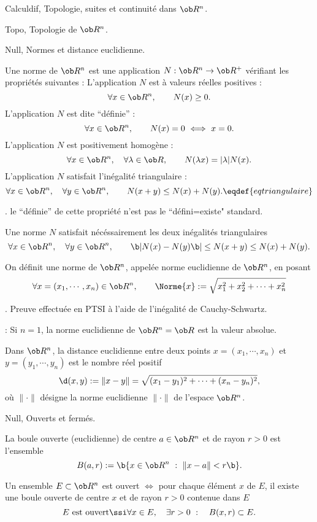 \Chapter Calculdif, Topologie, suites et continuit\'e dans $\ob R^n$.

\Section Topo, Topologie de $\ob R^n$. 

\Subsection Null, Normes et distance euclidienne. 

\Definition [$n\ge1$]
Une norme de $\ob R^n$ est une application $N:\ob R^n\to\ob R^+$ v\'erifiant les propri\'et\'es suivantes : 
\Bullet L'application $N$ est \`a valeurs r\'eelles positives :
$$
\forall x\in\ob R^n, \qquad N(x)\ge0.
$$
\Bullet L'application $N$ est dite ``d\'efinie'' :
$$
\forall x\in\ob R^n, \qquad N(x)=0\ \Longleftrightarrow\ x=0.
$$
\Bullet L'application $N$ est positivement homog\`ene :
$$
\forall x\in\ob R^n, \quad \forall \lambda\in\ob R,\qquad N(\lambda x)=|\lambda|N(x).
$$
\Bullet L'application $N$ satisfait l'in\'egalit\'e triangulaire :
$$
\forall x\in\ob R^n, \quad\forall y\in\ob R^n, \qquad N(x+y)\le N(x)+N(y).\eqdef{eqtriangulaire}
$$

. le ``d\'efinie'' de cette propri\'et\'e n'est pas le ``d\'efini=existe" standard. 
\medskip 

\noindent
{} Une norme $N$ satisfait n\'ec\'essairement les deux in\'egalit\'es triangulaires 
$$
\forall x\in\ob R^n, \quad \forall y\in\ob R^n, \qquad\b|N(x)-N(y)\b|\le N(x+y)\le N(x)+N(y).
$$

\Propriete [$n\ge1$] On d\'efinit une norme de $\ob R^n$, appel\'ee norme euclidienne de $\ob R^n$, en posant 
$$
\forall x=(x_1,\cdots, x_n)\in\ob R^n, \qquad \Norme{x}:=\sqrt{x_1^2+x_2^2+\cdots+x_n^2}
$$

\Demonstration. Preuve effectu\'ee en PTSI \`a l'aide de l'in\'egalit\'e de Cauchy-Schwartz.\CQFD

\Remarque : Si $n=1$, la norme euclidienne de $\ob R^n=\ob R$ est la valeur absolue. 
\bigskip


\Definition [$n\ge1$]
Dans $\ob R^n$, la distance euclidienne entre deux points $x=(x_1,\cdots,x_n)$ et $y=(y_1,\cdots,y_n)$ 
est le nombre r\'eel positif 
$$
\d(x,y):=\|x-y\|=\sqrt{(x_1-y_1)^2+\cdots+(x_n-y_n)^2}, 
$$
o\`u $\|\cdot\|$ d\'esigne la norme euclidienne $\|\cdot\|$ de l'espace $\ob R^n$. 


\Subsection Null, Ouverts et ferm\'es. 

La boule ouverte (euclidienne) de centre $a\in\ob R^n$ et de rayon $r>0$ est l'ensemble 
$$
\sc B(a,r):=\b\{x\in\ob R^n\ :\ \|x-a\|<r\b\}.
$$


\Definition [$n\ge1$] 
Un ensemble $E\subset\ob R^n$ est ouvert $\Longleftrightarrow$ pour chaque \'el\'ement $x$ de $E$, il existe une boule ouverte de centre $x$ et de rayon $r>0$ contenue dans $E$
$$
E\mbox{ est ouvert}\ssi\forall x\in E, \quad \exists r>0\ :\quad \sc B(x,r)\subset E.
$$


